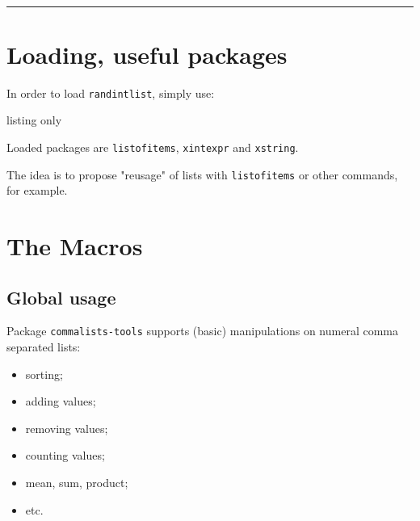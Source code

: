 \documentclass[11pt,a4paper]{ltxdoc}
\begin{document}
\vfill~

%

%

\hrule

\vspace*{5mm}

\pagebreak


\hypertarget{matoc}{}

\tableofcontents

\vspace*{5mm}


\pagebreak

\section{Loading, useful packages}

In order to load \texttt{randintlist}, simply use:

\begin{DemoCode}{listing only}
\usepackage{commalists-tools}
\end{DemoCode}

Loaded packages are \texttt{listofitems}, \texttt{xintexpr} and \texttt{xstring}.

\smallskip

The idea is to propose "reusage" of lists with \texttt{listofitems} or other commands, for example.

\section{The Macros}

\subsection{Global usage}

Package \texttt{commalists-tools} supports (basic) manipulations on numeral comma separated lists:

\begin{itemize}
	\item sorting;
	\item adding values;
	\item removing values;
	\item counting values;
	\item mean, sum, product;
	\item etc.
\end{itemize}
\end{document}
